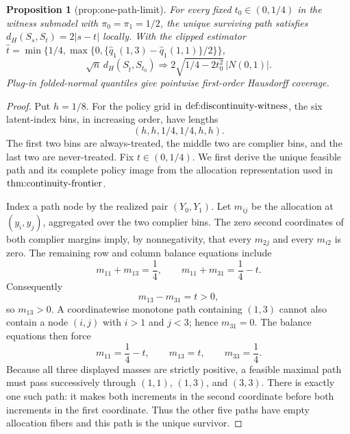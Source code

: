 \documentclass{article}
\newtheorem{proposition}{Proposition}
\begin{document}
\begin{proposition}[prop:one-path-limit]\label{prop:one-path-limit}
For every fixed \(t_0\in(0,1/4)\) in the witness submodel with \(\pi_0=\pi_1=1/2\), the unique surviving path satisfies \(d_H(S_s,S_t)=2|s-t|\) locally.  With the clipped estimator \(\widehat t=\min\{1/4,\max\{0,\{\widehat q_1(1,3)-\widehat q_1(1,1)\}/2\}\}\),
\[
\sqrt n\,d_H(S_{\widehat t},S_{t_0})\Rightarrow2\sqrt{1/4-2t_0^2}\,|N(0,1)|.
\]
Plug-in folded-normal quantiles give pointwise first-order Hausdorff coverage.
\end{proposition}
\begin{proof}
Put \(h=1/8\).  For the policy grid in \(\textnormal{def:discontinuity-witness}\), the six latent-index bins, in increasing order, have lengths
\[
(h,h,1/4,1/4,h,h).
\]
The first two bins are always-treated, the middle two are complier bins, and the last two are never-treated.  Fix \(t\in(0,1/4)\).  We first derive the unique feasible path and its complete policy image from the allocation representation used in \(\textnormal{thm:continuity-frontier}\).

Index a path node by the realized pair \((Y_0,Y_1)\).  Let \(m_{ij}\) be the allocation at \((y_i,y_j)\), aggregated over the two complier bins.  The zero second coordinates of both complier margins imply, by nonnegativity, that every \(m_{2j}\) and every \(m_{i2}\) is zero.  The remaining row and column balance equations include
\[
m_{11}+m_{13}=\frac14,
\qquad
m_{11}+m_{31}=\frac14-t.
\]
Consequently
\[
m_{13}-m_{31}=t>0,
\]
so \(m_{13}>0\).  A coordinatewise monotone path containing \((1,3)\) cannot also contain a node \((i,j)\) with \(i>1\) and \(j<3\); hence \(m_{31}=0\).  The balance equations then force
\[
m_{11}=\frac14-t,
\qquad
m_{13}=t,
\qquad
m_{33}=\frac14.
\]
Because all three displayed masses are strictly positive, a feasible maximal path must pass successively through \((1,1)\), \((1,3)\), and \((3,3)\).  There is exactly one such path: it makes both increments in the second coordinate before both increments in the first coordinate.  Thus the other five paths have empty allocation fibers and this path is the unique survivor.


\end{proof}
\end{document}
